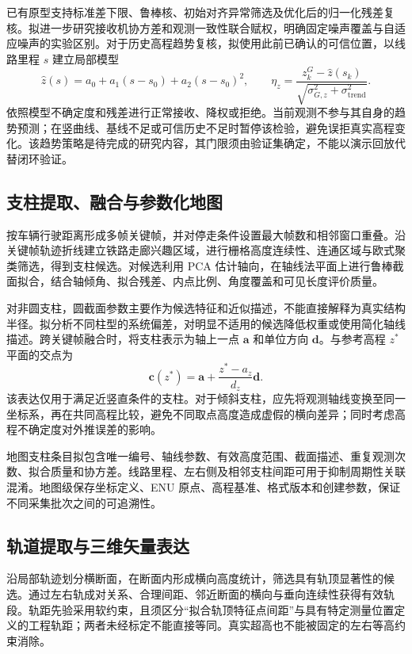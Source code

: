 \documentclass[UTF8,a4paper,12pt,fontset=fandol]{ctexart}
\newcommand{\vect}[1]{\bm{#1}}
\begin{document}
已有原型支持标准差下限、鲁棒核、初始对齐异常筛选及优化后的归一化残差复核。拟进一步研究接收机协方差和观测一致性联合赋权，明确固定噪声覆盖与自适应噪声的实验区别。对于历史高程趋势复核，拟使用此前已确认的可信位置，以线路里程 \(s\) 建立局部模型
\begin{equation}
 \widehat z(s)=a_0+a_1(s-s_0)+a_2(s-s_0)^2,\qquad
 \eta_z=\frac{z_k^G-\widehat z(s_k)}
 {\sqrt{\sigma_{G,z}^2+\sigma_{\mathrm{trend}}^2}}.
 \label{eq:trend}
\end{equation}
依照模型不确定度和残差进行正常接收、降权或拒绝。当前观测不参与其自身的趋势预测；在竖曲线、基线不足或可信历史不足时暂停该检验，避免误拒真实高程变化。该趋势策略是待完成的研究内容，其门限须由验证集确定，不能以演示回放代替闭环验证。

\subsection{支柱提取、融合与参数化地图}

按车辆行驶距离形成多帧关键帧，并对停走条件设置最大帧数和相邻窗口重叠。沿关键帧轨迹折线建立铁路走廊兴趣区域，进行栅格高度连续性、连通区域与欧式聚类筛选，得到支柱候选。对候选利用 PCA 估计轴向，在轴线法平面上进行鲁棒截面拟合，结合轴倾角、拟合残差、内点比例、角度覆盖和可见长度评价质量。

对非圆支柱，圆截面参数主要作为候选特征和近似描述，不能直接解释为真实结构半径。拟分析不同柱型的系统偏差，对明显不适用的候选降低权重或使用简化轴线描述。跨关键帧融合时，将支柱表示为轴上一点 \(\vect{a}\) 和单位方向 \(\vect{d}\)。与参考高程 \(z^\ast\) 平面的交点为
\begin{equation}
 \vect{c}(z^\ast)=
 \vect{a}+\frac{z^\ast-a_z}{d_z}\vect{d}.
 \label{eq:pole}
\end{equation}
该表达仅用于满足近竖直条件的支柱。对于倾斜支柱，应先将观测轴线变换至同一坐标系，再在共同高程比较，避免不同取点高度造成虚假的横向差异；同时考虑高程不确定度对外推误差的影响。

地图支柱条目拟包含唯一编号、轴线参数、有效高度范围、截面描述、重复观测次数、拟合质量和协方差。线路里程、左右侧及相邻支柱间距可用于抑制周期性关联混淆。地图级保存坐标定义、ENU 原点、高程基准、格式版本和创建参数，保证不同采集批次之间的可追溯性。

\subsection{轨道提取与三维矢量表达}

沿局部轨迹划分横断面，在断面内形成横向高度统计，筛选具有轨顶显著性的候选。通过左右轨成对关系、合理间距、邻近断面的横向与垂向连续性获得有效轨段。轨距先验采用软约束，且须区分“拟合轨顶特征点间距”与具有特定测量位置定义的工程轨距；两者未经标定不能直接等同。真实超高也不能被固定的左右等高约束消除。
\end{document}
